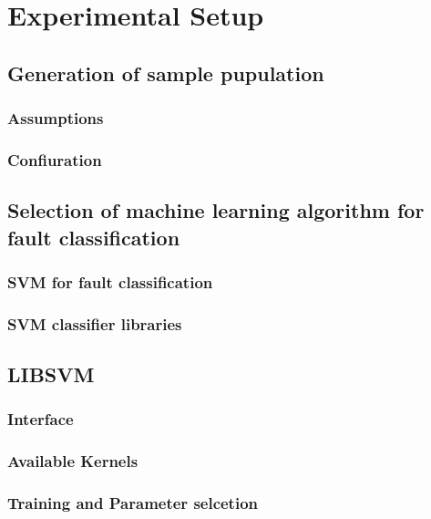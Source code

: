 \chapter{Experimental Setup}
\label{chap:chapter5}
\section{Generation of sample pupulation}
\subsection{Assumptions}
\subsection{Confiuration}
\section{Selection of machine learning algorithm for fault classification}
\subsection{SVM for fault classification}
\subsection{SVM classifier libraries}
\section{LIBSVM}
\subsection{Interface}
\subsection{Available Kernels}
\subsection{Training and Parameter selcetion}
